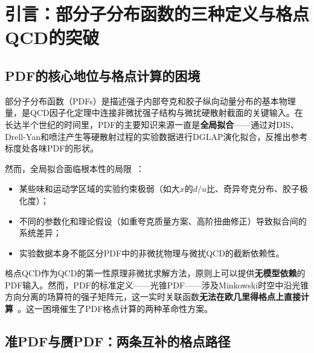 \documentclass[12pt,a4paper]{ctexart}
\theoremstyle{definition}
\begin{document}
\begin{abstract}
\textbf{第六层——数值全景与唯象学影响（§7）：}以LPC、CLQCD和BNL/ANL合作组的夸克和胶子PDF计算为例，展示完整的准PDF/赝PDF计算链的数值实现。讨论格点PDF与全局拟合（CT18、NNPDF4.0、MSHT20）的比较现状，以及EIC时代格点PDF作为理论先验的独特价值。

全篇以统一的数学语言（算符定义、因子化定理、匹配核、反常维数、重整化群重求和）将光锥PDF、准PDF和赝PDF编织成一个自洽的理论整体，为格点部分子物理的计算实践提供了系统性的理论手册。
\end{abstract}

\tableofcontents
\newpage

\section{引言：部分子分布函数的三种定义与格点QCD的突破}

\subsection{PDF的核心地位与格点计算的困境}

部分子分布函数（PDFs）是描述强子内部夸克和胶子纵向动量分布的基本物理量，是QCD因子化定理中连接非微扰强子结构与微扰硬散射截面的关键输入。在长达半个世纪的时间里，PDF的主要知识来源一直是\textbf{全局拟合}——通过对DIS、Drell-Yan和喷注产生等硬散射过程的实验数据进行DGLAP演化拟合，反推出参考标度处各味PDF的形状。

然而，全局拟合面临根本性的局限~\cite{NNPDF2021}：
\begin{itemize}[nosep]
    \item 某些味和运动学区域的实验约束极弱（如大$x$的$d/u$比、奇异夸克分布、胶子极化度）；
    \item 不同的参数化和理论假设（如重夸克质量方案、高阶扭曲修正）导致拟合间的系统差异；
    \item 实验数据本身不能区分PDF中的非微扰物理与微扰QCD的截断依赖性。
\end{itemize}

格点QCD作为QCD的第一性原理非微扰求解方法，原则上可以提供\textbf{无模型依赖}的PDF输入。然而，PDF的标准定义——光锥PDF——涉及Minkowski时空中沿光锥方向分离的场算符的强子矩阵元，这一实时关联函数\textbf{无法在欧几里得格点上直接计算}~\cite{Ji2013Euclidean,Izubuchi2018}。这一困境催生了PDF格点计算的两种革命性方案。

\subsection{准PDF与赝PDF：两条互补的格点路径}
\end{document}
